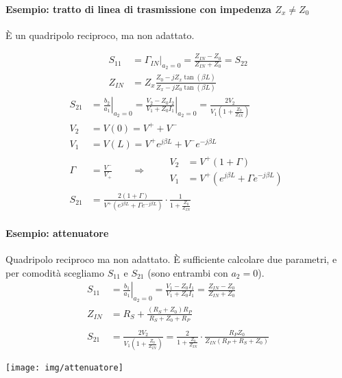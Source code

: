 \paragraph{Esempio: tratto di linea di trasmissione con impedenza $Z_x \neq Z_0$}

È un quadripolo reciproco, ma non adattato.

$$
\begin{aligned}
S_{11} &= \left. \Gamma_{IN} \right|_{a_2 = 0} =
\frac{Z_{IN} - Z_0}{Z_{IN} + Z_0} = S_{22}\\
Z_{IN} &= Z_x \frac{Z_0-jZ_x\tan(\beta L)}{Z_x-jZ_0\tan(\beta L)}
\end{aligned}
$$
$$
\begin{aligned}
S_{21} &= \left. \frac{b_2}{a_1} \right|_{a_2=0} = \left.\frac{V_2 - Z_0 I_2}{V_1 + Z_0 I_1} \right|_{a_2 = 0} = 
\frac{2V_2}{V_1 \left(1+\frac{Z_0}{Z_{IN}} \right)}\\
V_2 &= V(0) = V^+ + V^- \\
V_1 &= V(L) = V^+ e^{j\beta L} + V^- e^{-j\beta L}\\
\Gamma &= \frac{V^-}{V_+} \qquad\Rightarrow\qquad
\begin{aligned}
V_2 &= V^+ (1 + \Gamma)\\
V_1 &= V^+ (e^{j\beta L} + \Gamma e^{-j\beta L})
\end{aligned}\\
S_{21} &= \frac{2(1+\Gamma)}{V^+ (e^{j\beta L} + \Gamma e^{-j\beta L})} \cdot \frac{1}{1+\frac{Z_0}{Z_{IN}}}
\end{aligned}$$


\begin{minipage}{.65\linewidth}
	\paragraph{Esempio: attenuatore}
	Quadripolo reciproco ma non adattato. È sufficiente calcolare due parametri, e per comodità scegliamo $S_{11}$ e $S_{21}$ (sono entrambi con $a_2 = 0$).
	\begin{align*}
	S_{11} &= \left. \frac{b_1}{a_1} \right|_{a_2=0}
	=\frac{V_1 - Z_0 I_1}{V_1 + Z_0 I_1}
	= \frac{Z_{IN} - Z_0}{Z_{IN} + Z_0}\\
	Z_{IN} &= R_S + \frac{(R_S + Z_0)R_P}{R_S + Z_0 + R_P}\\
	\\
	S_{21} &= \frac{2V_2}{
		V_1\left( 1+\frac{Z_0}{Z_{IN}} \right)
	} = 
	\frac{2}{1+\frac{Z_0}{Z_{IN}}} \cdot
	\frac{R_P Z_0}{Z_{IN}(R_P+R_S+Z_0)}
	\end{align*}
\end{minipage}
\begin{minipage}[t]{.35\linewidth}
	\centering
	\texttt{[image: img/attenuatore]}
\end{minipage}

